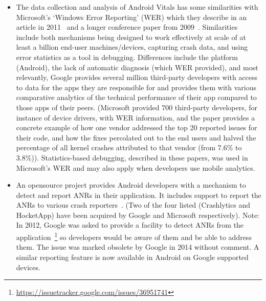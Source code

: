 \begin{itemize}
    \item The data collection and analysis of Android Vitals has some similarities with Microsoft's `Windows Error Reporting' (WER) which they describe in an article in 2011~\citep{kinshuman2011_debugging_in_the_very_large} and a longer conference paper from 2009~\citep{kinshuman2009_debugging_in_the_very_large}. Similarities include both mechanisms being designed to work effectively at scale of at least a billion end-user machines/devices, capturing crash data, and using error statistics as a tool in debugging. Differences include the platform (Android), the lack of automatic diagnosis (which WER provided), and most relevantly, Google provides several million third-party developers with access to data for the apps they are responsible for and provides them with various comparative analytics of the technical performance of their app compared to those apps of their peers. (Microsoft provided 700 third-party developers, for instance of device drivers, with WER information, and the paper provides a concrete example of how one vendor addressed the top 20 reported issues for their code, and how the fixes percolated out to the end users and halved the percentage of all kernel crashes attributed to that vendor (from 7.6\% to 3.8\%)). Statistics-based debugging, described in these papers, was used in Microsoft's WER and may also apply when developers use mobile analytics.
    
    \item An opensource project provides Android developers with a mechanism to detect and report ANRs in their application. It includes support to report the ANRs to various crash reporters~\citep{salomonbrys_github_anr_watchdog}. (Two of the four listed (Crashlytics and HocketApp) have been acquired by Google and Microsoft respectively). Note: In 2012, Google was asked to provide a facility to detect ANRs from the application~\footnote{\url{https://issuetracker.google.com/issues/36951741}} so developers would be aware of them and be able to address them. The issue was marked obsolete by Google in 2014 without comment. A similar reporting feature is now available in Android on Google supported devices.
    

\end{itemize}
